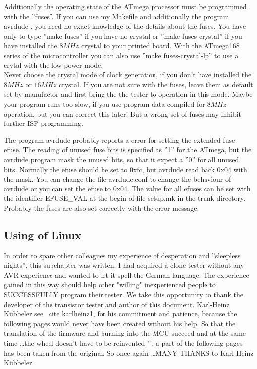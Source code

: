 Additionally the operating state of the ATmega processor must be programmed with the ''fuses''.
If you can use my Makefile and additionally the program avrdude \cite{avrdude}, you need no exact
knowledge of the details about the fuses.
You have only to type ''make fuses'' if you have no crystal or
''make fuses-crystal'' if you have installed the \(8MHz\) crystal to your printed board.
With the ATmega168 series of the microcontroller you can also use ''make fuses-crystal-lp''
to use a crytal with the low power mode.\\
Never choose the crystal mode of clock generation, if you don't have installed
the \(8MHz\) or \(16MHz\) crystal.
If you are not sure with the fuses, leave them as default
set by manufactor and first bring the the tester to operation in this mode.
Maybe your program runs too slow, if you use program data compiled for
\(8MHz\) operation, but you can correct this later!
But a wrong set of fuses may inhibit further ISP-programming.

The program avrdude probably reports a error for setting the extended fuse efuse.
The reading of unused fuse bits is specified as ''1'' for the ATmega, but the
avrdude program mask the unused bits, so that it expect a ''0'' for all unused bits.
Normally the efuse should be set to 0xfc, but avrdude read back 0x04 with the mask.
You can change the file avrdude.conf to change the behaviour of avrdude or
you can set the efuse to 0x04. 
The value for all efuses can be set with the identifier EFUSE\_VAL at the begin of file setup.mk
in the trunk directory.
Probably the fuses are also set correctly with the error message.

\newpage
\subsection{Using of Linux}
In order to spare other colleagues my experience of desperation and ''sleepless nights'',
this subchapter was written.
I had acquired a clone tester without any AVR experience and wanted to let it spell the
German language. 
The experience gained in this way should help other "willing" inexperienced people to
SUCCESSFULLY program their tester. 
We take this opportunity to thank the developer of the transistor tester and author of this document, Karl-Heinz Kübbeler see \ cite {karlheinz1}, for his commitment and patience,
because the following pages would never have been created without his help. 
So that the translation of the firmware and burning into the MCU succeed and at the same
time \dots the wheel doesn't have to be reinvented "',
a part of the following pages has been taken from the original. 
So once again \dots \LARGE {MANY THANKS}
\normalsize to Karl-Heinz Kübbeler. 

